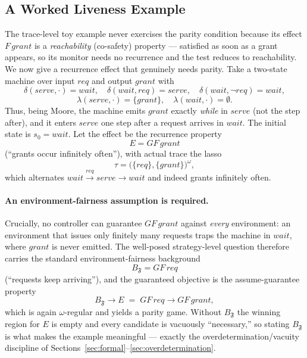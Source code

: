 \documentclass[11pt]{article}
\theoremstyle{remark}
\newcommand{\Frame}{\mathfrak{F}}
\begin{document}
\subsection{A Worked Liveness Example}
\label{sec:liveness-example}

The trace-level toy example never exercises the parity condition because its
effect \(F\,grant\) is a \emph{reachability} (co-safety) property --- satisfied as
soon as a grant appears, so its monitor needs no recurrence and the test reduces
to reachability. We now give a recurrence effect that genuinely needs parity. Take
a two-state machine over input \(req\) and output \(grant\) with
\[
  \delta(\mathit{serve},\cdot)=\mathit{wait},\quad
  \delta(\mathit{wait},req)=\mathit{serve},\quad
  \delta(\mathit{wait},\neg req)=\mathit{wait},
\]
\[
  \lambda(\mathit{serve},\cdot)=\{grant\},\quad
  \lambda(\mathit{wait},\cdot)=\emptyset .
\]
Thus, being Moore, the machine emits \(grant\) exactly \emph{while} in
\(\mathit{serve}\) (not the step after), and it enters \(\mathit{serve}\) one step
after a request arrives in \(\mathit{wait}\). The initial state is
\(s_0=\mathit{wait}\). Let the effect be the recurrence
property
\[
  E = GF\,grant
\]
(``grants occur infinitely often''), with actual trace the lasso
\[
  \tau=\bigl(\{req\},\{grant\}\bigr)^\omega ,
\]
which alternates \(\mathit{wait}\xrightarrow{req}\mathit{serve}\xrightarrow{}
\mathit{wait}\) and indeed grants infinitely often.

\paragraph{An environment-fairness assumption is required.} Crucially, no
controller can guarantee \(GF\,grant\) against \emph{every} environment: an
environment that issues only finitely many requests traps the machine in
\(\mathit{wait}\), where \(grant\) is never emitted. The well-posed strategy-level
question therefore carries the standard environment-fairness background
\[
  B_{\Frame} = GF\,req
\]
(``requests keep arriving''), and the guaranteed objective is the assume-guarantee
property
\[
  B_{\Frame}\rightarrow E \;=\; GF\,req \rightarrow GF\,grant ,
\]
which is again \(\omega\)-regular and yields a parity game. Without \(B_{\Frame}\)
the winning region for \(E\) is empty and every candidate is vacuously
``necessary,'' so stating \(B_{\Frame}\) is what makes the example meaningful ---
exactly the overdetermination/vacuity discipline of
Sections~\ref{sec:formal}--\ref{sec:overdetermination}.
\end{document}
